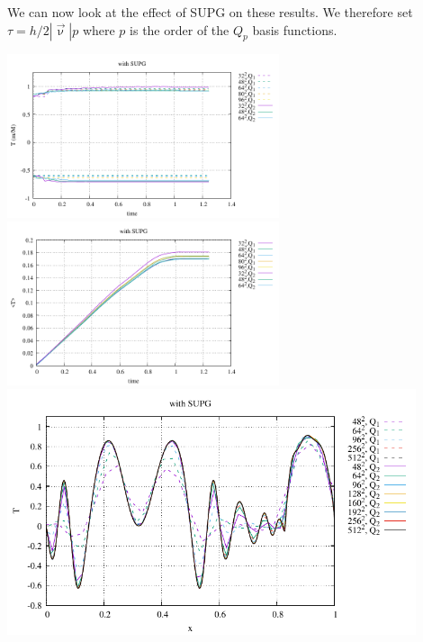We can now look at the effect of SUPG on these results. We therefore set $\tau=h/2|\vec\upnu|p$
where $p$ is the order of the $Q_p$ basis functions.

\begin{center}
\includegraphics[width=8cm]{python_codes/fieldstone_43/results/experiment9/stats_T_SUPG.pdf}
\includegraphics[width=8cm]{python_codes/fieldstone_43/results/experiment9/avrg_T_SUPG.pdf}\\
\includegraphics[width=12cm]{python_codes/fieldstone_43/results/experiment9/diagonal_SUPG.pdf}
\end{center}




